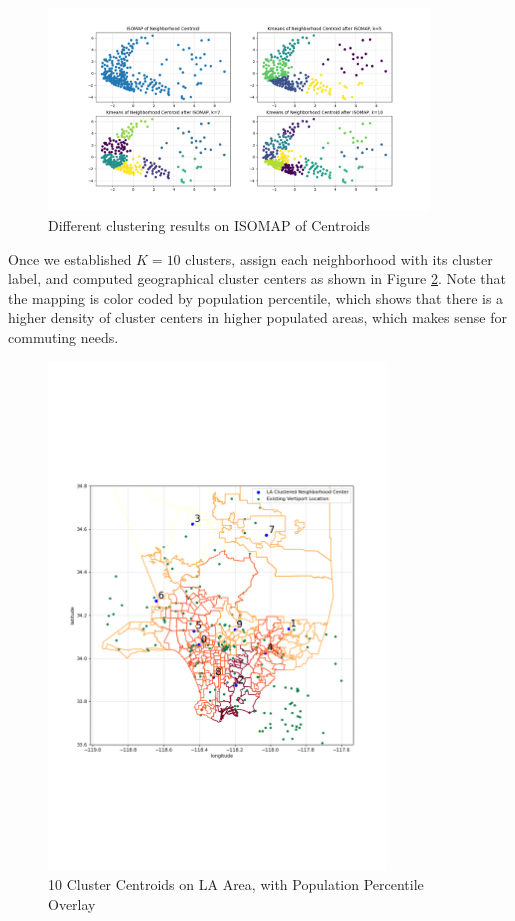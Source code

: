 \documentclass{article}
\begin{document}
\begin{figure}[ht]
\centering
\includegraphics[width=0.9\textwidth]{proj03.png}
\vspace*{-10mm}
\caption{Different clustering results on ISOMAP of Centroids }
\label{fig:proj03}
\end{figure}

Once we established $K=10$ clusters, assign each neighborhood with its cluster label, and computed geographical cluster centers as shown in Figure \ref{fig:proj04}. Note that the mapping is color coded by population percentile, which shows that there is a higher density of cluster centers in higher populated areas, which makes sense for commuting needs.

\begin{figure}[ht]
\centering
\includegraphics[width=0.8\textwidth]{proj04.png}
\vspace*{-45mm}
\caption{10 Cluster Centroids on LA Area, with Population Percentile Overlay }
\label{fig:proj04}
\end{figure}
\end{document}

